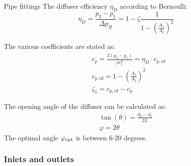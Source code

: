 \documentclass{article}
\begin{document}
\newpage
\begin{multicols}{2}
\setlength{\columnsep}{1pt}
\begin{theorybox}{Pipe fittings}
    The diffuser efficiency $\eta_D$ according to Bernoulli:
    \begin{equation}
        \eta_D = \frac{p_2 - p_1}{\Delta p_B} = 1 - \zeta \frac{1}{1 - \left(\frac{A_1}{A_2}\right)^2}
    \end{equation}

    The various coefficients are stated as:
    \begin{align}
        &c_p = \frac{2\left(p_2 - p_1\right)}{\rho v_1^2} = \eta_D \cdot c_{p,id}\\
        &c_{p,id} = 1 - \left(\frac{A_1}{A_2}\right)^2\\
        &\zeta_1 = c_{p,id} - c_p
    \end{align}

    The opening angle of the diffuser can be calculated as:
    \begin{align}
        \tan(\theta) = \frac{d_2 - d_1}{2L}\\
        \varphi = 2\theta
    \end{align}
    The optimal angle $\varphi_{\rm opt}$ is between 6-20 degrees.

    \subsubsection{Inlets and outlets}
\end{theorybox}







\end{multicols}
\end{document}

